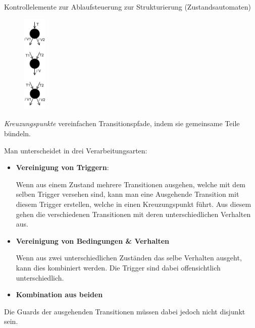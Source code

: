 \begin{diag}{Kontrollelemente zur Ablaufsteuerung zur Strukturierung (Zustandsautomaten)}
    \begin{figure}
        \centering
        \includegraphics[width=0.1\textwidth]{includes/figures/defi_diagrams_state_crosspoint.pdf}
    \end{figure}
    \emph{Kreuzungspunkte} vereinfachen Transitionspfade, indem sie gemeinsame Teile bündeln.

    Man unterscheidet in drei Verarbeitungsarten:
    \begin{itemize}
        \item \textbf{Vereinigung von Triggern}:

              Wenn aus einem Zustand mehrere Transitionen ausgehen, welche mit dem selben Trigger versehen sind, kann man eine Ausgehende Transition mit diesem Trigger erstellen, welche in einen Kreuzungspunkt führt.
              Aus diesem gehen die verschiedenen Transitionen mit deren unterschiedlichen Verhalten aus.
        \item \textbf{Vereinigung von Bedingungen \& Verhalten}

              Wenn aus zwei unterschiedlichen Zuständen das selbe Verhalten ausgeht, kann dies kombiniert werden.
              Die Trigger sind dabei offensichtlich unterschiedlich.
        \item \textbf{Kombination aus beiden}
    \end{itemize}

    Die Guards der ausgehenden Transitionen müssen dabei jedoch nicht disjunkt sein.
\end{diag}


